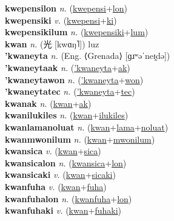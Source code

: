 \textbf{kwepensilon} \textit{n.} (\hyperref[kwepensi]{kwepensi}+\hyperref[lon]{lon})
 \label{kwepensilon} \\
\textbf{kwepensiki} \textit{v.} (\hyperref[kwepensi]{kwepensi}+\hyperref[ki]{ki})
 \label{kwepensiki} \\
\textbf{kwepensikilum} \textit{n.} (\hyperref[kwepensiki]{kwepensiki}+\hyperref[lum]{lum})
 \label{kwepensikilum} \\
\textbf{kwan} \textit{n.} ({\chinese{}光} [kwɑŋ˥])
luz \label{kwan} \\
\textbf{'kwaneyta} \textit{n.} (Eng. ⟨Grenada⟩ [ɡɹʷəˈneɪ̯də])
 \label{'kwaneyta} \\
\textbf{'kwaneytaak} \textit{n.} (\hyperref['kwaneyta]{'kwaneyta}+\hyperref[ak]{ak})
 \label{'kwaneytaak} \\
\textbf{'kwaneytawon} \textit{n.} (\hyperref['kwaneyta]{'kwaneyta}+\hyperref[won]{won})
 \label{'kwaneytawon} \\
\textbf{'kwaneytatec} \textit{n.} (\hyperref['kwaneyta]{'kwaneyta}+\hyperref[tec]{tec})
 \label{'kwaneytatec} \\
\textbf{kwanak} \textit{n.} (\hyperref[kwan]{kwan}+\hyperref[ak]{ak})
 \label{kwanak} \\
\textbf{kwanilukiles} \textit{n.} (\hyperref[kwan]{kwan}+\hyperref[ilukiles]{ilukiles})
 \label{kwanilukiles} \\
\textbf{kwanlamanoluat} \textit{n.} (\hyperref[kwan]{kwan}+\hyperref[lama]{lama}+\hyperref[noluat]{noluat})
 \label{kwanlamanoluat} \\
\textbf{kwanmwonilum} \textit{n.} (\hyperref[kwan]{kwan}+\hyperref[mwonilum]{mwonilum})
 \label{kwanmwonilum} \\
\textbf{kwansica} \textit{v.} (\hyperref[kwan]{kwan}+\hyperref[sica]{sica})
 \label{kwansica} \\
\textbf{kwansicalon} \textit{n.} (\hyperref[kwansica]{kwansica}+\hyperref[lon]{lon})
 \label{kwansicalon} \\
\textbf{kwansicaki} \textit{v.} (\hyperref[kwan]{kwan}+\hyperref[sicaki]{sicaki})
 \label{kwansicaki} \\
\textbf{kwanfuha} \textit{v.} (\hyperref[kwan]{kwan}+\hyperref[fuha]{fuha})
 \label{kwanfuha} \\
\textbf{kwanfuhalon} \textit{n.} (\hyperref[kwanfuha]{kwanfuha}+\hyperref[lon]{lon})
 \label{kwanfuhalon} \\
\textbf{kwanfuhaki} \textit{v.} (\hyperref[kwan]{kwan}+\hyperref[fuhaki]{fuhaki})
 \label{kwanfuhaki} \\
